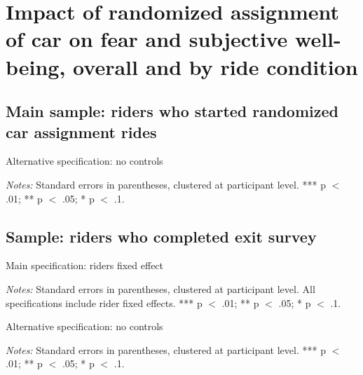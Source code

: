 \documentclass[12pt]{article}
\begin{document}
\section{Impact of randomized assignment of car on fear and subjective well-being, overall and by ride condition}

\subsection{Main sample: riders who started randomized car assignment rides}

\begin{table}[H]
	\centering
	\caption{Alternative specification: no controls}
	\begin{adjustbox}{max width = \textwidth}
		\begin{threeparttable}
			
			\begin{tablenotes}
				\item  \footnotesize\textit{Notes:} Standard errors in parentheses, clustered at participant level. *** p $<$ .01; ** p $<$ .05; * p $<$ .1.
			\end{tablenotes}
		\end{threeparttable}
	\end{adjustbox}
\end{table}

\subsection{Sample: riders who completed exit survey}

\begin{table}[H]
	\centering
	\caption{Main specification: riders fixed effect}
	\begin{adjustbox}{max width = \textwidth}
		\begin{threeparttable}
			
			\begin{tablenotes}
				\item  \footnotesize\textit{Notes:} Standard errors in parentheses, clustered at participant level. All specifications include rider fixed effects. *** p $<$ .01; ** p $<$ .05; * p $<$ .1.
			\end{tablenotes}
		\end{threeparttable}
	\end{adjustbox}
\end{table}

\begin{table}[H]
	\centering
	\caption{Alternative specification: no controls}
	\begin{adjustbox}{max width = \textwidth}
		\begin{threeparttable}
			
			\begin{tablenotes}
				\item  \footnotesize\textit{Notes:} Standard errors in parentheses, clustered at participant level. *** p $<$ .01; ** p $<$ .05; * p $<$ .1.
			\end{tablenotes}
		\end{threeparttable}
	\end{adjustbox}
\end{table}
\end{document}
